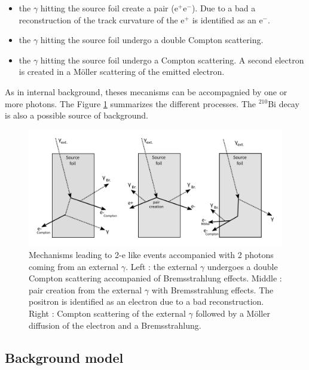 \documentclass[main.tex]{subfiles}
\begin{document}
\begin{itemize}
\item the $\gamma$ hitting the source foil create a pair (e$^+$e$^-$). Due to a bad a reconstruction of the track curvature of the e$^+$ is identified as an e$^-$.
\item the $\gamma$ hitting the source foil undergo a double Compton scattering.
\item the $\gamma$ hitting the source foil undergo a Compton scattering. A second electron is created in a M\"oller scattering of the emitted electron.
\end{itemize} 


\NI As in internal background, theses mecanisms can be accompagnied by one or more photons. The Figure \ref{ExternalBkgPicture}  summarizes the different processes. The $^{\text{210}}$Bi decay is also a possible source of background.



\begin{figure}[h!]
\begin{center}
\includegraphics[scale=0.47]{pictures/Chap6/ExternalBkg.pdf}
\end{center}
\caption{Mechanisms leading to 2-e like events accompanied with 2 photons coming from an external $\gamma$. Left : the external $\gamma$ undergoes a double Compton scattering accompanied of Bremsstrahlung effects. Middle : pair creation from the external $\gamma$ with Bremsstrahlung effects. The positron is identified as an electron due to a bad reconstruction. Right : Compton scattering of the external $\gamma$ followed by a M\"oller diffusion of the electron and a Bremsstrahlung.}
\label{ExternalBkgPicture}
\end{figure}


\FloatBarrier


\subsection{Background model}
\end{document}
